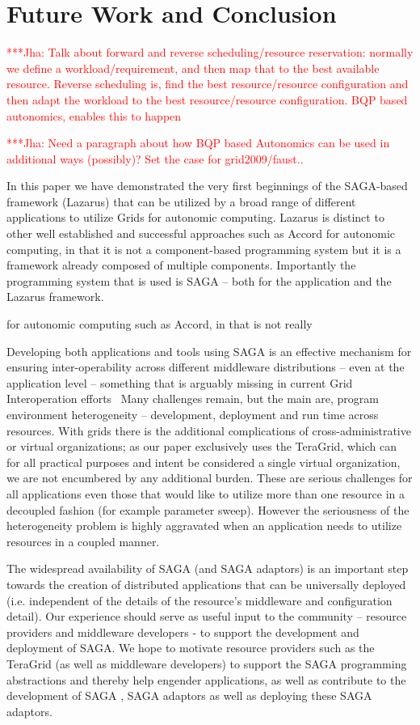 \documentclass[conference,final]{IEEEtran}
\newcommand{\jhanote}[1]{ {\textcolor{red} { ***Jha: #1 }}}
\newcommand{\jhanote}[1]{}
\begin{document}
\section{Future Work and Conclusion}

\jhanote{Talk about forward and reverse scheduling/resource
  reservation: normally we define a workload/requirement, and then map
  that to the best available resource. Reverse scheduling is, find the
  best resource/resource configuration and then adapt the workload to
  the best resource/resource configuration. BQP based autonomics,
  enables this to happen}

\jhanote{Need a paragraph about how BQP based Autonomics can be used
  in additional ways (possibly)? Set the case for grid2009/faust..}

In this paper we have demonstrated the very first beginnings of the
SAGA-based framework (Lazarus) that can be utilized by a broad range
of different applications to utilize Grids for autonomic computing.
Lazarus is distinct to other well established and successful
approaches such as Accord for autonomic computing, in that it is not a
component-based programming system but it is a framework already
composed of multiple components. Importantly the programming system
that is used is SAGA -- both for the application and the Lazarus
framework.

for autonomic computing such as Accord, in that is not really 



Developing both applications and tools using SAGA is an effective
mechanism for ensuring inter-operability across different middleware
distributions -- even at the application level -- something that is
arguably missing in current Grid Interoperation
efforts~\cite{gin_paper} Many challenges remain, but the main are,
program environment heterogeneity -- development, deployment and run
time across resources.  With grids there is the additional
complications of cross-administrative or virtual organizations; as our
paper exclusively uses the TeraGrid, which can for all practical
purposes and intent be considered a single virtual organization, we
are not encumbered by any additional burden. These are serious
challenges for all applications even those that would like to utilize
more than one resource in a decoupled fashion (for example parameter
sweep).  However the seriousness of the heterogeneity problem is
highly aggravated when an application needs to utilize resources in a
coupled manner.

The widespread availability of SAGA (and SAGA adaptors) is an
important step towards the creation of distributed applications that
can be universally deployed (i.e.  independent of the details of the
resource's middleware and configuration detail).  Our experience
should serve as useful input to the community -- resource providers
and middleware developers - to support the development and deployment
of SAGA.  We hope to motivate  resource providers such as the TeraGrid
(as well as middleware developers) to support the SAGA programming
abstractions and thereby help engender applications, as well as
contribute to the development of SAGA , SAGA adaptors as well as
deploying these SAGA adaptors.
\end{document}
